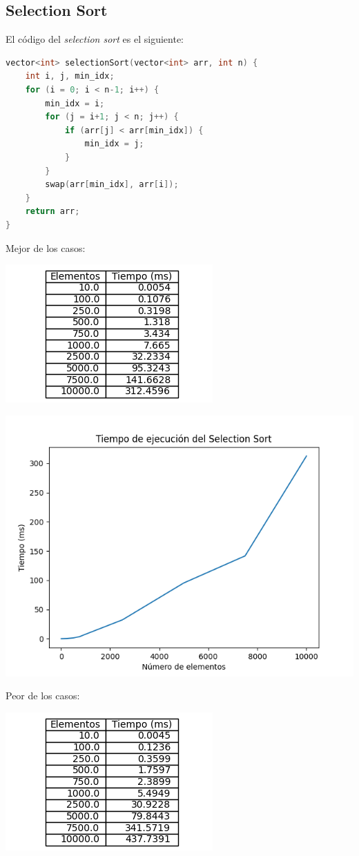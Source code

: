 \documentclass[14pt,a4paper]{report}
\begin{document}
\subsection*{Selection Sort}
\quad El código del \textit{selection sort} es el siguiente:
\begin{lstlisting}[language=C++]
vector<int> selectionSort(vector<int> arr, int n) {
    int i, j, min_idx;
    for (i = 0; i < n-1; i++) {
        min_idx = i;
        for (j = i+1; j < n; j++) {
            if (arr[j] < arr[min_idx]) {
                min_idx = j;
            }
        }
        swap(arr[min_idx], arr[i]);
    }
    return arr;
}
\end{lstlisting}
Mejor de los casos:
\begin{center}
\includegraphics[scale=1]{../tabla-selection-best.png}  
\end{center}
\begin{center}
\includegraphics[scale=0.9]{../grafica-selection-best.png} 
\end{center}
\newpage
Peor de los casos:
\begin{center}
\includegraphics[scale=1]{../tabla-selection-worst.png}  
\end{center}
\end{document}
